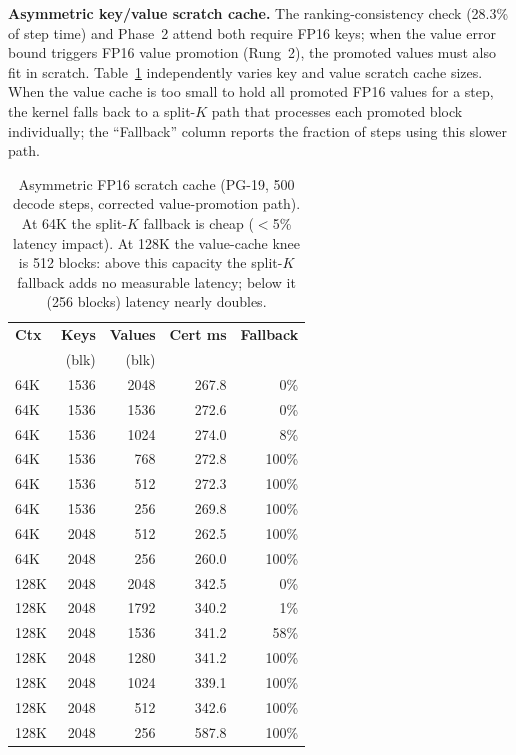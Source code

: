 \documentclass[10pt,twocolumn,a4paper]{article}
\theoremstyle{definition}
\theoremstyle{remark}
\begin{document}
\textbf{Asymmetric key/value scratch cache.}  The ranking-consistency check (28.3\% of step time) and Phase~2 attend both require FP16 keys; when the value error bound triggers FP16 value promotion (Rung~2), the promoted values must also fit in scratch.  Table~\ref{tab:asymmetric_cache} independently varies key and value scratch cache sizes.  When the value cache is too small to hold all promoted FP16 values for a step, the kernel falls back to a split-$K$ path that processes each promoted block individually; the ``Fallback'' column reports the fraction of steps using this slower path.

\begin{table}[ht]
\centering
\caption{Asymmetric FP16 scratch cache (PG-19, 500 decode steps, corrected value-promotion path).  At 64K the split-$K$ fallback is cheap ($<$5\% latency impact).  At 128K the value-cache knee is 512 blocks: above this capacity the split-$K$ fallback adds no measurable latency; below it (256 blocks) latency nearly doubles.}
\label{tab:asymmetric_cache}
\footnotesize
\begin{tabular}{lrrrr}
\toprule
\textbf{Ctx} & \textbf{Keys} & \textbf{Values} & \textbf{Cert ms} & \textbf{Fallback} \\
 & (blk) & (blk) & & \\
\midrule
64K & 1536 & 2048 & 267.8 & 0\% \\
64K & 1536 & 1536 & 272.6 & 0\% \\
64K & 1536 & 1024 & 274.0 & 8\% \\
64K & 1536 & 768  & 272.8 & 100\% \\
64K & 1536 & 512  & 272.3 & 100\% \\
64K & 1536 & 256  & 269.8 & 100\% \\
64K & 2048 & 512  & 262.5 & 100\% \\
\rowcolor[gray]{0.92}
64K & 2048 & 256  & 260.0 & 100\% \\
\midrule
128K & 2048 & 2048 & 342.5 & 0\% \\
128K & 2048 & 1792 & 340.2 & 1\% \\
128K & 2048 & 1536 & 341.2 & 58\% \\
128K & 2048 & 1280 & 341.2 & 100\% \\
128K & 2048 & 1024 & 339.1 & 100\% \\
\rowcolor[gray]{0.92}
128K & 2048 & 512  & 342.6 & 100\% \\
128K & 2048 & 256  & 587.8 & 100\% \\
\bottomrule
\end{tabular}
\end{table}
\end{document}
